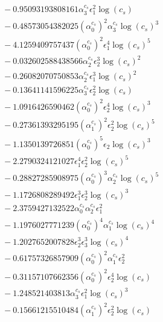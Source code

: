 \documentclass[10pt]{article}
\begin{document}
\begin{align*}
&{}  - 0.95093193808161 \alpha_{3}^{c_s} \epsilon_{1}^{2} \log{\left(c_{s} \right)} \\
&{}  - 0.48573054382025 \left(\alpha_{0}^{c_s}\right)^{2} \alpha_{3}^{c_s} \log{\left(c_{s} \right)}^{3} \\
&{}  - 4.1259409757437 \left(\alpha_{0}^{c_s}\right)^{2} \epsilon_{1}^{4} \log{\left(c_{s} \right)}^{5} \\
&{}  - 0.032602588438566 \alpha_{2}^{c_s} \epsilon_{2}^{3} \log{\left(c_{s} \right)}^{2} \\
&{}  - 0.26082070750853 \alpha_{2}^{c_s} \epsilon_{1}^{3} \log{\left(c_{s} \right)}^{2} \\
&{}  - 0.13641141596225 \alpha_{3}^{c_s} \epsilon_{2}^{2} \log{\left(c_{s} \right)} \\
&{}  - 1.0916426590462 \left(\alpha_{0}^{c_s}\right)^{2} \epsilon_{2}^{4} \log{\left(c_{s} \right)}^{3} \\
&{}  - 0.27361393295195 \left(\alpha_{1}^{c_s}\right)^{2} \epsilon_{2}^{2} \log{\left(c_{s} \right)}^{5} \\
&{}  - 1.1350139726851 \left(\alpha_{0}^{c_s}\right)^{5} \epsilon_{2} \log{\left(c_{s} \right)}^{3} \\
&{}  - 2.2790324121027 \epsilon_{1}^{4} \epsilon_{2}^{2} \log{\left(c_{s} \right)}^{5} \\
&{}  - 0.28827285908975 \left(\alpha_{0}^{c_s}\right)^{3} \alpha_{2}^{c_s} \log{\left(c_{s} \right)}^{5} \\
&{}  - 1.1726808289492 \epsilon_{1}^{3} \epsilon_{2}^{3} \log{\left(c_{s} \right)}^{3} \\
&{}  - 2.3759427132522 \alpha_{0}^{c_s} \alpha_{2}^{c_s} \epsilon_{1}^{2} \\
&{}  - 1.1976027771239 \left(\alpha_{0}^{c_s}\right)^{4} \alpha_{1}^{c_s} \log{\left(c_{s} \right)}^{4} \\
&{}  - 1.2027652007828 \epsilon_{2}^{3} \epsilon_{3}^{3} \log{\left(c_{s} \right)}^{4} \\
&{}  - 0.61757326857909 \left(\alpha_{0}^{c_s}\right)^{2} \alpha_{1}^{c_s} \epsilon_{2}^{2} \\
&{}  - 0.31157107662356 \left(\alpha_{0}^{c_s}\right)^{2} \epsilon_{2}^{4} \log{\left(c_{s} \right)} \\
&{}  - 1.248521403813 \alpha_{3}^{c_s} \epsilon_{1}^{2} \log{\left(c_{s} \right)}^{3} \\
&{}  - 0.15661215510484 \left(\alpha_{1}^{c_s}\right)^{2} \epsilon_{2}^{2} \log{\left(c_{s} \right)} \\

\end{align*}
\end{document}
